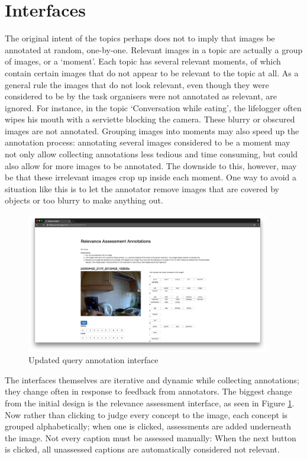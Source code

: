 \section{Interfaces}

The original intent of the topics perhaps does not to imply that images be annotated at random, one-by-one. Relevant images in a topic are actually a group of images, or a `moment'. Each topic has several relevant moments, of which  contain certain images that do not appear to be relevant to the topic at all. As a general rule the images that do not look relevant, even though they were considered to be by the task organisers were not annotated as relevant, are ignored. For instance, in the topic `Conversation while eating', the lifelogger often wipes his mouth with a serviette blocking the camera. These blurry or obscured images are not annotated. Grouping images into moments may also speed up the annotation process: annotating several images considered to be a moment may not only allow collecting annotations less tedious and time consuming, but could also allow for more images to be annotated. The downside to this, however, may be that these irrelevant images crop up inside each moment. One way to avoid a situation like this is to let the annotator remove images that are covered by objects or too blurry to make anything out.

\begin{figure}[h]
    \centering
    \includegraphics[width=0.95\textwidth]{images/new-rel-ass-interface}
    \caption{Updated query annotation interface}
    \label{fig:new-rel-ass}
\end{figure}

The interfaces themselves are iterative and dynamic while collecting annotations; they change often in response to feedback from annotators. The biggest change from the initial design is the relevance assessment interface, as seen in Figure \ref{fig:new-rel-ass}. Now rather than clicking to judge every concept to the image, each concept is grouped alphabetically; when one is clicked, assessments are added underneath the image. Not every caption must be assessed manually: When the next button is clicked, all unassessed captions are automatically considered not relevant. 




